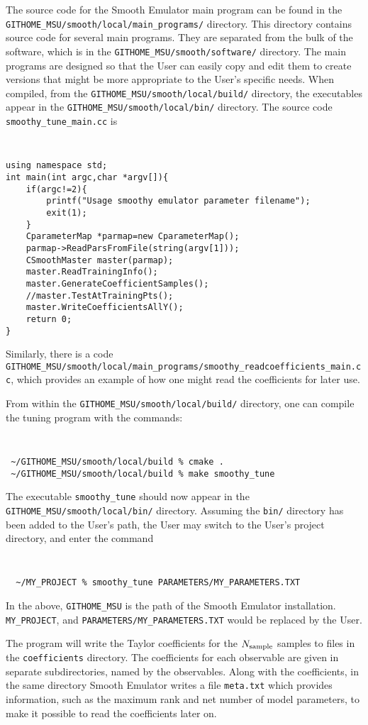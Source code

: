 \documentclass[main.tex]{subfiles}
\begin{document}
The source code for the Smooth Emulator main program can be found in the {\tt GITHOME\_MSU/smooth/local/main\_programs/} directory. This directory contains source code for several main programs. They are separated from the bulk of the software, which is in the {\tt GITHOME\_MSU/smooth/software/} directory. The main programs are designed so that the User can easily copy and edit them to create versions that might be more appropriate to the User's specific needs. When compiled, from the {\tt GITHOME\_MSU/smooth/local/build/} directory, the executables appear in the {\tt GITHOME\_MSU/smooth/local/bin/} directory. The source code {\tt smoothy\_tune\_main.cc} is
{\tt
\begin{verbatim}
using namespace std;
int main(int argc,char *argv[]){
    if(argc!=2){
        printf("Usage smoothy emulator parameter filename");
        exit(1);
    }
    CparameterMap *parmap=new CparameterMap();
    parmap->ReadParsFromFile(string(argv[1]));
    CSmoothMaster master(parmap);
    master.ReadTrainingInfo();
    master.GenerateCoefficientSamples();
    //master.TestAtTrainingPts();
    master.WriteCoefficientsAllY();
    return 0;
}
\end{verbatim}
}
Similarly, there is a code {\tt GITHOME\_MSU/smooth/local/main\_programs/smoothy\_readcoefficients\_main.cc}, which provides an example of how one might read the coefficients for later use.

From within the {\tt GITHOME\_MSU/smooth/local/build/} directory, one can compile the tuning program with the commands:
{\tt
\begin{verbatim}
 ~/GITHOME_MSU/smooth/local/build % cmake .
 ~/GITHOME_MSU/smooth/local/build % make smoothy_tune
\end{verbatim}
}
The executable {\tt smoothy\_tune} should now appear in the {\tt GITHOME\_MSU/smooth/local/bin/} directory. Assuming the {\tt bin/} directory has been added to the User's path, the User may switch to the User's project directory, and enter the command
{\tt
\begin{verbatim}
  ~/MY_PROJECT % smoothy_tune PARAMETERS/MY_PARAMETERS.TXT
\end{verbatim}
}
In the above, {\tt GITHOME\_MSU} is the path of the Smooth Emulator installation. {\tt MY\_PROJECT}, and {\tt PARAMETERS/MY\_PARAMETERS.TXT} would be replaced by the User.

The program will write the Taylor coefficients for the $N_{\rm sample}$ samples to files in the {\tt coefficients} directory.  The coefficients for each observable are given in separate subdirectories, named by the observables. Along with the coefficients, in the same directory Smooth Emulator writes a file {\tt meta.txt} which provides information, such as the maximum rank and net number of model parameters, to make it possible to read the coefficients later on.
\end{document}
